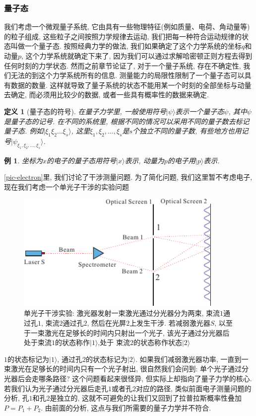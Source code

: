 \documentclass[a4paper,11pt]{article}
\newtheorem{definition}{\hspace{2em}定义}[section]
\newtheorem{example}{例}[section]
\begin{document}
\subsubsection{量子态}
我们考虑一个微观量子系统, 它由具有一些物理特征(例如质量、电荷、角动量等)的粒子组成, 这些粒子之间按照力学规律去运动, 我们把每一种符合运动规律的状态叫做一个量子态. 按照经典力学的做法, 我们如果确定了这个力学系统的坐标$q$和动量$p$, 这个力学系统就确定下来了, 因为我们可以通过求解哈密顿正则方程去得到任何时刻的力学状态. 然而之前章节论证了, 对于一个量子系统, 存在不确定性, 我们无法的到这个力学系统所有的信息. 测量能力的局限性限制了一个量子态可以具有数据的数量. 这样就导致了量子系统的状态不能用某一个时刻的全部坐标与动量去确定, 而必须用比较少的数据, 或者一些具有概率性的数据来确定.
\begin{definition}[量子态的符号]
  在量子力学里, 一般使用符号$|\psi\rangle$表示一个量子态$\psi$, 其中$\psi$是量子态的记号. 在不同的系统里, 根据不同的情况可以采用不同的量子数去标记量子态. 例如$|\xi_1\xi_2\dots \xi_s\rangle$, 这里$\xi_1,\xi_2,\dots,\xi_s$是$s$个独立不同的量子数, 有些地方也用记号$|\psi_{\xi_1,\xi_2,\dots,\xi_s}\rangle$.
\end{definition}
\begin{example}
  坐标为$x$的电子的量子态用符号$|x\rangle$表示, 动量为$p$的电子用$|p\rangle$表示.
\end{example}
\ref{pic-electron}里, 我们讨论了干涉测量问题. 为了简化问题, 我们这里暂不考虑电子, 现在我们考虑一个单光子干涉的实验问题
\begin{figure}[H]
  \centering
  \includegraphics[width=10cm]{fig8.pdf}
  \caption{单光子干涉实验: 激光器发射一束激光通过分光器分为两束, 束流$1$通过孔$1$, 束流$2$通过孔$2$, 然后在光屏$2$上发生干涉. 若减弱激光器$S$, 以至于一束激光在足够长的时间内只射出一个光子, 该光子通过分光器后处于束流$1$的状态称作$|1\rangle$,处于 束流$2$的状态称作状态$|2\rangle$}\label{Single photon interference}
\end{figure}
$1$的状态标记为$|1\rangle$, 通过孔$2$的状态标记为$|2\rangle$. 如果我们减弱激光器功率, 一直到一束激光在足够长的时间内只有一个光子射出, 很自然我们会问到: 单个光子通过分光器后会走哪条路径? 这个问题看起来很怪异, 但实际上却指向了量子力学的核心. 若我们认为光子通过分光器后走孔$1$或者孔$2$对应的路径, 类似前面电子测量问题的分析, 孔$1$和孔$2$是独立的, 这就不可避免的让我们又回到了拉普拉斯概率性叠加$P=P_1+P_2$. 由前面的分析, 这点与我们所需要的量子力学并不符合.
\end{document}
